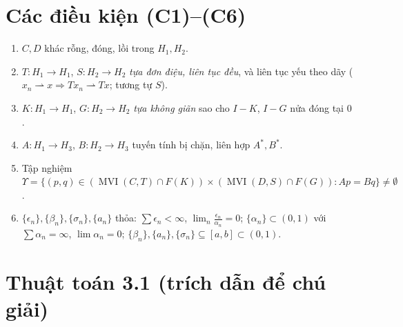 \documentclass[11pt,a4paper]{article}
\theoremstyle{plain}
\theoremstyle{definition}
\newcommand{\Fix}{F}
\DeclareMathOperator{\MVI}{MVI}
\begin{document}
\section{Các điều kiện (C1)--(C6)}
\begin{enumerate}[label=(C\arabic*),leftmargin=2.4em,itemsep=1pt]
\item $C,D$ khác rỗng, đóng, lồi trong $H_1,H_2$.
\item $T:H_1\to H_1$, $S:H_2\to H_2$ \emph{tựa đơn điệu, liên tục đều}, và liên tục yếu theo dãy ($x_n\rightharpoonup x\Rightarrow Tx_n\rightharpoonup Tx$; tương tự $S$).
\item $K:H_1\to H_1$, $G:H_2\to H_2$ \emph{tựa không giãn} sao cho $I-K$, $I-G$ nửa đóng tại $0$.
\item $A:H_1\to H_3$, $B:H_2\to H_3$ tuyến tính bị chặn, liên hợp $A^{*},B^{*}$.
\item Tập nghiệm $\Upsilon=\bigl\{(p,q)\in(\MVI(C,T)\cap \Fix(K))\times(\MVI(D,S)\cap \Fix(G)):Ap=Bq\bigr\}\ne\emptyset$.
\item $\{\epsilon_n\},\{\beta_n\},\{\sigma_n\},\{a_n\}$ thỏa: $\sum\epsilon_n<\infty$, $\lim_n\tfrac{\epsilon_n}{\alpha_n}=0$; $\{\alpha_n\}\subset(0,1)$ với $\sum\alpha_n=\infty$, $\lim\alpha_n=0$; $\{\beta_n\},\{a_n\},\{\sigma_n\}\subseteq[a,b]\subset(0,1)$.
\end{enumerate}

\section{Thuật toán 3.1 (trích dẫn để chú giải)}
\end{document}

